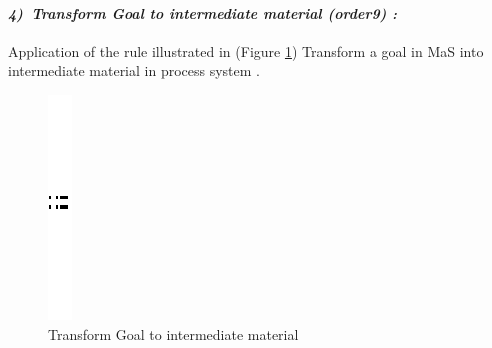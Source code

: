 \paragraph{\emph{4)~Transform Goal to intermediate material (order9) :} }
 
 
Application of the rule illustrated in (Figure \ref{fig:Transform Goal to intermediate material}) Transform a goal in MaS into intermediate material in process system .
 
\begin{figure}[th]

\centering 

\quad{}
\includegraphics{Chapiter3/img/sep}
\quad{}

\caption{\label{fig:Transform Goal to intermediate material}Transform Goal to intermediate material}
 
\end{figure}
 
